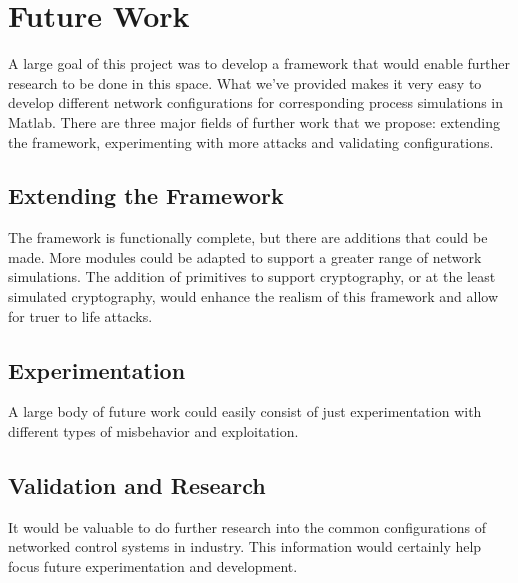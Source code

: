 \section{Future Work}
A large goal of this project was to develop a framework that would enable further research to be done in this space.  What we've provided makes it very easy to develop different network configurations for corresponding process simulations in Matlab.  There are three major fields of further work that we propose: extending the framework, experimenting with more attacks and validating configurations.  

\subsection{Extending the Framework}
The framework is functionally complete, but there are additions that could be made.  More modules could be adapted to support a greater range of network simulations.  The addition of primitives to support cryptography, or at the least simulated cryptography, would enhance the realism of this framework and allow for truer to life attacks.

\subsection{Experimentation}
A large body of future work could easily consist of just experimentation with different types of misbehavior and exploitation.

\subsection{Validation and Research}
It would be valuable to do further research into the common configurations of networked control systems in industry.  This information would certainly help focus future experimentation and development.